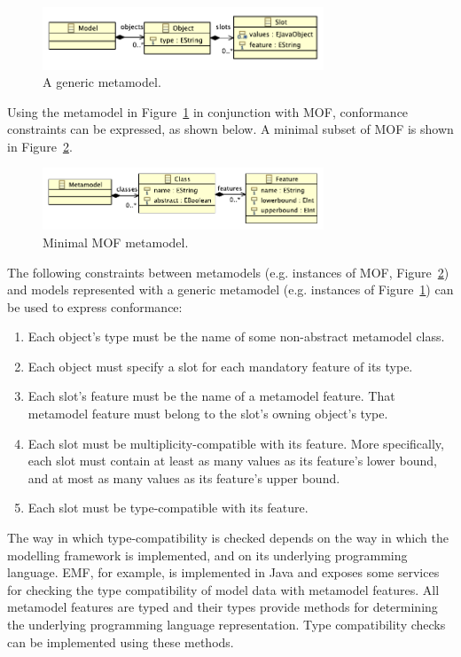 \begin{figure}[htbp]
  \centering
  \includegraphics[width=3.3in]{5.Implementation/slot_model.pdf}
  \caption{A generic metamodel.}
  \label{fig:slot_model}
\end{figure}

Using the metamodel in Figure~\ref{fig:slot_model} in conjunction with MOF, conformance constraints can be expressed, as shown below. A minimal subset of MOF is shown in Figure~\ref{fig:minimal_mof}.

\begin{figure}[htbp]
  \centering
  \includegraphics[width=3.3in]{5.Implementation/mof.pdf}
  \caption{Minimal MOF metamodel.}
  \label{fig:minimal_mof}
\end{figure}

The following constraints between metamodels (e.g. instances of MOF, Figure~\ref{fig:minimal_mof}) and models represented with a generic metamodel (e.g. instances of Figure~\ref{fig:slot_model}) can be used to express conformance:

\begin{enumerate}
	\item Each object's type must be the name of some non-abstract metamodel class.
	\item Each object must specify a slot for each mandatory feature of its type.
	\item Each slot's feature must be the name of a metamodel feature. That metamodel feature must belong to the slot's owning object's type.
	\item Each slot must be multiplicity-compatible with its feature. More specifically, each slot must contain at least as many values as its feature's lower bound, and at most as many values as its feature's upper bound.
  \item Each slot must be type-compatible with its feature.
\end{enumerate}

The way in which type-compatibility is checked depends on the way in which the modelling framework is implemented, and on its underlying programming language. EMF, for example, is implemented in Java and exposes some services for checking the type compatibility of model data with metamodel features. All metamodel features are typed and their types provide methods for determining the underlying programming language representation. Type compatibility checks can be implemented using these methods.

